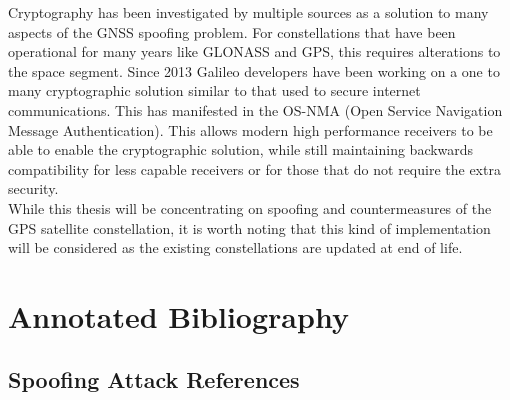 Cryptography has been investigated by multiple sources as a solution to many aspects of the GNSS spoofing problem. For constellations that have been operational for many
years like GLONASS and GPS, this requires alterations to the space segment. Since 2013 Galileo developers have been working on a one to many cryptographic solution
similar to that used to secure internet communications. This has manifested in the OS-NMA (Open Service Navigation Message Authentication). This allows modern high
performance receivers to be able to enable the cryptographic solution, while still maintaining backwards compatibility for less capable receivers or for those that do
not require the extra security.  \\ 
While this thesis will be concentrating on spoofing and countermeasures of the GPS satellite constellation, it is worth noting that this kind of implementation will be
considered as the existing constellations are updated at end of life.

\section{Annotated Bibliography}
\subsection{Spoofing Attack References}

